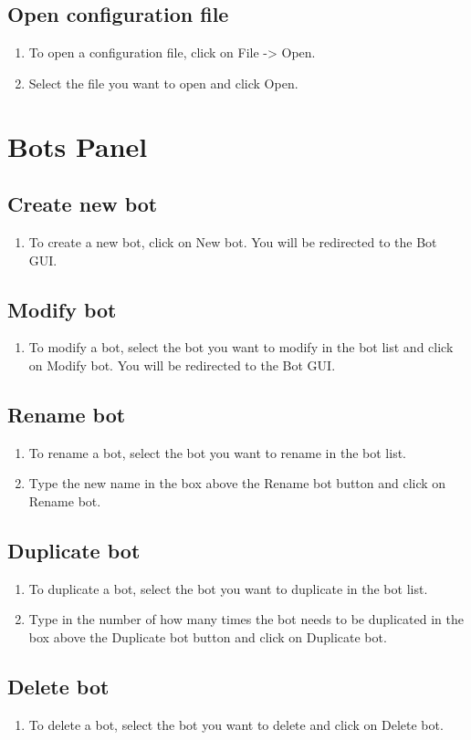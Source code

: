 \documentclass[a4paper]{article}
\begin{document}
\subsection{Open configuration file}
\begin{enumerate}
	\item To open a configuration file, click on File -> Open.
	\item Select the file you want to open and click Open.
\end{enumerate}

\section{Bots Panel}
\subsection{Create new bot}
\begin{enumerate}
	\item To create a new bot, click on New bot. You will be redirected to the Bot GUI.
\end{enumerate}

\subsection{Modify bot}
\begin{enumerate}
	\item To modify a bot, select the bot you want to modify in the bot list and click on Modify bot. You will be redirected to the Bot GUI.
\end{enumerate}

\subsection{Rename bot}
\begin{enumerate}
	\item To rename a bot, select the bot you want to rename in the bot list.
	\item Type the new name in the box above the Rename bot button and click on Rename bot.
\end{enumerate}

\subsection{Duplicate bot}
\begin{enumerate}
	\item To duplicate a bot, select the bot you want to duplicate in the bot list.
	\item Type in the number of how many times the bot needs to be duplicated in the box above the Duplicate bot button and click on Duplicate bot.
\end{enumerate}

\subsection{Delete bot}
\begin{enumerate}
	\item To delete a bot, select the bot you want to delete and click on Delete bot.
\end{enumerate}
\end{document}

